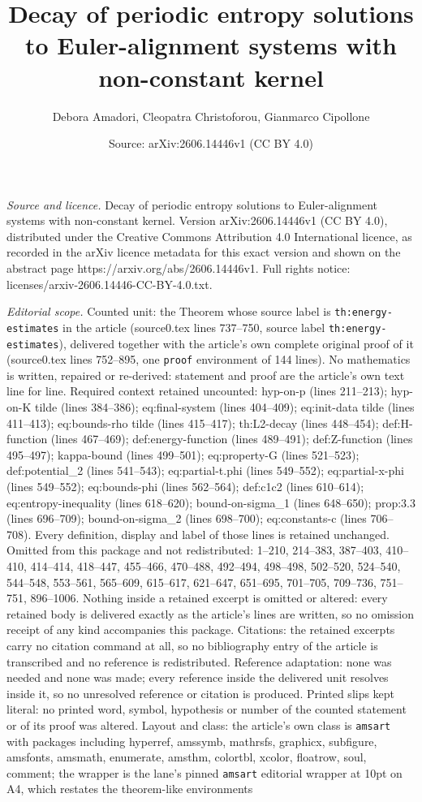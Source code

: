 \documentclass[10pt,a4paper]{amsart}
\title[Decay of periodic entropy solutions to Euler-alignment syste]{Decay of periodic entropy solutions to Euler-alignment systems with non-constant kernel}
\author{Debora Amadori, Cleopatra Christoforou, Gianmarco Cipollone}
\date{Source: arXiv:2606.14446v1 (CC BY 4.0)}
\begin{document}
\maketitle

\noindent\emph{Source and licence.} Decay of periodic entropy solutions to Euler-alignment systems with non-constant kernel. Version arXiv:2606.14446v1 (CC BY 4.0), distributed under the Creative Commons Attribution 4.0 International licence, as recorded in the arXiv licence metadata for this exact version and shown on the abstract page https://arxiv.org/abs/2606.14446v1. Full rights notice: licenses/arxiv-2606.14446-CC-BY-4.0.txt.\par\smallskip

\noindent\textit{Editorial scope.} Counted unit: the Theorem whose source label is \texttt{th:energy-estimates} in the article (source0.tex lines 737--750, source label \texttt{th:energy-estimates}), delivered together with the article's own complete original proof of it (source0.tex lines 752--895, one \texttt{proof} environment of 144 lines). No mathematics is written, repaired or re-derived: statement and proof are the article's own text line for line. Required context retained uncounted: hyp-on-p (lines 211--213); hyp-on-K tilde (lines 384--386); eq:final-system (lines 404--409); eq:init-data tilde (lines 411--413); eq:bounds-rho tilde (lines 415--417); th:L2-decay (lines 448--454); def:H-function (lines 467--469); def:energy-function (lines 489--491); def:Z-function (lines 495--497); kappa-bound (lines 499--501); eq:property-G (lines 521--523); def:potential\_2 (lines 541--543); eq:partial-t.phi (lines 549--552); eq:partial-x-phi (lines 549--552); eq:bounds-phi (lines 562--564); def:c1c2 (lines 610--614); eq:entropy-inequality (lines 618--620); bound-on-sigma\_1 (lines 648--650); prop:3.3 (lines 696--709); bound-on-sigma\_2 (lines 698--700); eq:constants-c (lines 706--708). Every definition, display and label of those lines is retained unchanged. Omitted from this package and not redistributed: 1--210, 214--383, 387--403, 410--410, 414--414, 418--447, 455--466, 470--488, 492--494, 498--498, 502--520, 524--540, 544--548, 553--561, 565--609, 615--617, 621--647, 651--695, 701--705, 709--736, 751--751, 896--1006. Nothing inside a retained excerpt is omitted or altered: every retained body is delivered exactly as the article's lines are written, so no omission receipt of any kind accompanies this package. Citations: the retained excerpts carry no citation command at all, so no bibliography entry of the article is transcribed and no reference is redistributed. Reference adaptation: none was needed and none was made; every reference inside the delivered unit resolves inside it, so no unresolved reference or citation is produced. Printed slips kept literal: no printed word, symbol, hypothesis or number of the counted statement or of its proof was altered. Layout and class: the article's own class is \texttt{amsart} with packages including hyperref, amssymb, mathrsfs, graphicx, subfigure, amsfonts, amsmath, enumerate, amsthm, colortbl, xcolor, floatrow, soul, comment; the wrapper is the lane's pinned \texttt{amsart} editorial wrapper at 10pt on A4, which restates the theorem-like environments 
\end{document}
